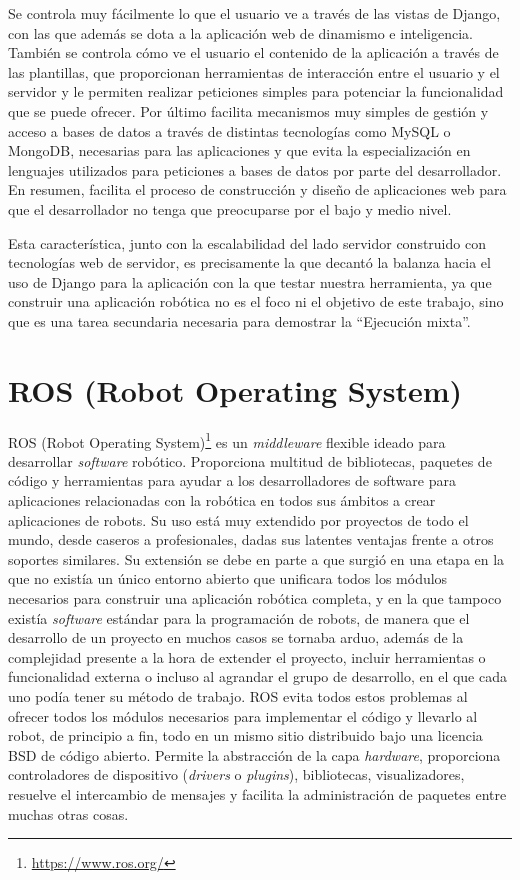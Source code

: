 Se controla muy fácilmente lo que el usuario ve a través de las vistas de Django, con las que además se dota a la aplicación web de dinamismo e inteligencia. También se controla cómo ve el usuario el contenido de la aplicación a través de las plantillas, que proporcionan herramientas de interacción entre el usuario y el servidor y le permiten realizar peticiones simples para potenciar la funcionalidad que se puede ofrecer. Por último facilita mecanismos muy simples de gestión y acceso a bases de datos a través de distintas tecnologías como MySQL o MongoDB, necesarias para las aplicaciones y que evita la especialización en lenguajes utilizados para peticiones a bases de datos por parte del desarrollador. En resumen, facilita el proceso de construcción y diseño de aplicaciones web para que el desarrollador no tenga que preocuparse por el bajo y medio nivel.

Esta característica, junto con la escalabilidad del lado servidor construido con tecnologías web de servidor, es precisamente la que decantó la balanza hacia el uso de Django para la aplicación con la que testar nuestra herramienta, ya que construir una aplicación robótica no es el foco ni el objetivo de este trabajo, sino que es una tarea secundaria necesaria para demostrar la ``Ejecución mixta''.

\section{ROS (Robot Operating System)}

ROS (Robot Operating System)\footnote{\url{https://www.ros.org/}} es un \textit{middleware} flexible ideado para desarrollar \textit{software} robótico. Proporciona multitud de bibliotecas, paquetes de código y herramientas para ayudar a los desarrolladores de software para aplicaciones relacionadas con la robótica en todos sus ámbitos a crear aplicaciones de robots. Su uso está muy extendido por proyectos de todo el mundo, desde caseros a profesionales, dadas sus latentes ventajas frente a otros soportes similares. Su extensión se debe en parte a que surgió en una etapa en la que no existía un único entorno abierto que unificara todos los módulos necesarios para construir una aplicación robótica completa, y en la que tampoco existía \textit{software} estándar para la programación de robots, de manera que el desarrollo de un proyecto en muchos casos se tornaba arduo, además de la complejidad presente a la hora de extender el proyecto, incluir herramientas o funcionalidad externa o incluso al agrandar el grupo de desarrollo, en el que cada uno podía tener su método de trabajo. ROS evita todos estos problemas al ofrecer todos los módulos necesarios para implementar el código y llevarlo al robot, de principio a fin, todo en un mismo sitio distribuido bajo una licencia BSD de código abierto. Permite la abstracción de la capa \textit{hardware}, proporciona controladores de dispositivo (\textit{drivers} o \textit{plugins}), bibliotecas, visualizadores, resuelve el intercambio de mensajes y facilita la administración de paquetes entre muchas otras cosas.

